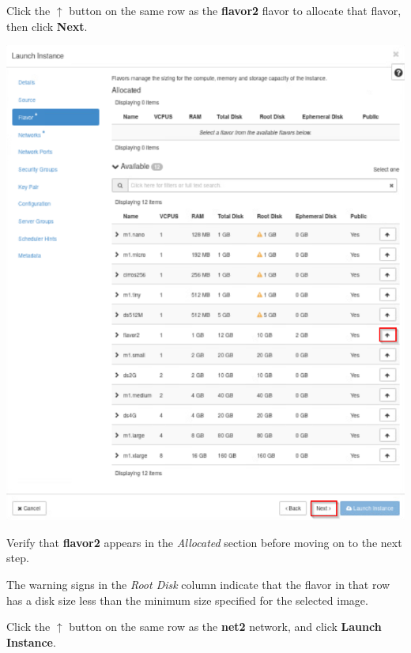 \documentclass[letterpaper, 12pt]{article}
\begin{document}
\begin{enumerate}
    \begin{labstep}
        Click the $\uparrow$ button on the same row as the \textbf{flavor2} flavor to allocate that flavor, then click \textbf{Next}.
        \begin{center}
            \includegraphics[width=\linewidth]{images/part4/step5.png}
        \end{center}
    \end{labstep}

    \begin{stopbox}
        Verify that \textbf{flavor2} appears in the \textit{Allocated} section before moving on to the next step.
    \end{stopbox}
    \begin{notebox}
        The warning signs in the \textit{Root Disk} column indicate that the flavor in that row has a disk size less than the minimum size specified for the selected image.
    \end{notebox}

    \begin{labstep}
        Click the $\uparrow$ button on the same row as the \textbf{net2} network, and click \textbf{Launch Instance}.


\end{labstep}
\end{enumerate}
\end{document}
